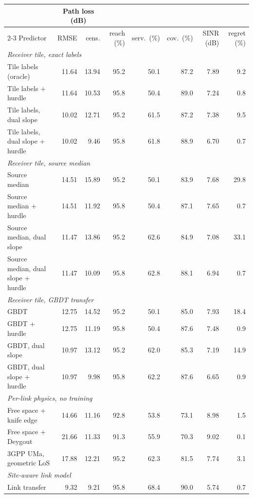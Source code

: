 \begin{tabular}{lrrrrrrr}
\toprule
& \multicolumn{2}{c}{Path loss (dB)} & & & & & \\
\cmidrule(lr){2-3}
Predictor & RMSE & cens. & reach (\%) & serv.\ (\%) & cov.\ (\%) & SINR (dB) & regret (\%) \\
\midrule
\multicolumn{8}{l}{\emph{Receiver tile, exact labels}} \\
Tile labels (oracle) & 11.64 & 13.94 & 95.2 & 50.1 & 87.2 & 7.89 & 9.2 \\
Tile labels + hurdle & 11.64 & 10.53 & 95.8 & 50.4 & 89.0 & 7.24 & 0.8 \\
Tile labels, dual slope & 10.02 & 12.71 & 95.2 & 61.5 & 87.2 & 7.38 & 9.5 \\
Tile labels, dual slope + hurdle & 10.02 & 9.46 & 95.8 & 61.8 & 88.9 & 6.70 & 0.7 \\
\multicolumn{8}{l}{\emph{Receiver tile, source median}} \\
Source median & 14.51 & 15.89 & 95.2 & 50.1 & 83.9 & 7.68 & 29.8 \\
Source median + hurdle & 14.51 & 11.92 & 95.8 & 50.4 & 87.1 & 7.65 & 0.7 \\
Source median, dual slope & 11.47 & 13.86 & 95.2 & 62.6 & 84.9 & 7.08 & 33.1 \\
Source median, dual slope + hurdle & 11.47 & 10.09 & 95.8 & 62.8 & 88.1 & 6.94 & 0.7 \\
\multicolumn{8}{l}{\emph{Receiver tile, GBDT transfer}} \\
GBDT & 12.75 & 14.52 & 95.2 & 50.1 & 85.0 & 7.93 & 18.4 \\
GBDT + hurdle & 12.75 & 11.19 & 95.8 & 50.4 & 87.6 & 7.48 & 0.9 \\
GBDT, dual slope & 10.97 & 13.12 & 95.2 & 62.0 & 85.3 & 7.19 & 14.9 \\
GBDT, dual slope + hurdle & 10.97 & 9.98 & 95.8 & 62.2 & 87.6 & 6.65 & 0.9 \\
\multicolumn{8}{l}{\emph{Per-link physics, no training}} \\
Free space + knife edge & 14.66 & 11.16 & 92.8 & 53.8 & 73.1 & 8.98 & 1.5 \\
Free space + Deygout & 21.66 & 11.33 & 91.3 & 55.9 & 70.3 & 9.02 & 0.1 \\
3GPP UMa, geometric LoS & 17.88 & 12.21 & 95.2 & 62.3 & 81.5 & 7.74 & 3.1 \\
\multicolumn{8}{l}{\emph{Site-aware link model}} \\
Link transfer & 9.32 & 9.21 & 95.8 & 68.4 & 90.0 & 5.74 & 0.7 \\
\bottomrule
\end{tabular}

